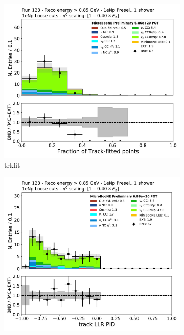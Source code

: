\begin{figure}[H]
    \centering
    \begin{subfigure}{0.3\textwidth}
    \includegraphics[width=1.0\textwidth]{Sidebands/Figures/1eNp/HighEnergy/HiEext_NPOneShr_NPL_pi0e040/trkfit.pdf}
    \caption{trkfit}
    \end{subfigure}
    \begin{subfigure}{0.3\textwidth}
    \includegraphics[width=1.0\textwidth]{Sidebands/Figures/1eNp/HighEnergy/HiEext_NPOneShr_NPL_pi0e040/trkpid.pdf}

\end{subfigure}
\end{figure}
